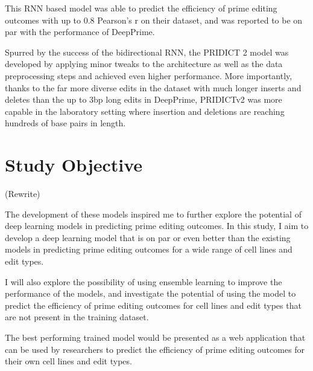 This RNN based model was able to predict the efficiency of prime editing outcomes with up to 0.8 Pearson's r on their dataset, and was reported to be on par with the performance of DeepPrime.

Spurred by the success of the bidirectional RNN, the PRIDICT 2 model was developed by applying minor tweaks to the architecture as well as the data preprocessing steps and achieved even higher performance\cite{mathisMachineLearningPrediction2024}. More importantly, thanks to the far more diverse edits in the dataset with much longer inserts and deletes than the up to 3bp long edits in DeepPrime, PRIDICTv2 was more capable in the laboratory setting where insertion and deletions are reaching hundreds of base pairs in length\cite{liuPrimeEditingPrecise2023}.

\section{Study Objective}

(Rewrite)

The development of these models inspired me to further explore the potential of deep learning models in predicting prime editing outcomes. In this study, I aim to develop a deep learning model that is on par or even better than the existing models in predicting prime editing outcomes for a wide range of cell lines and edit types. 

I will also explore the possibility of using ensemble learning to improve the performance of the models, and investigate the potential of using the model to predict the efficiency of prime editing outcomes for cell lines and edit types that are not present in the training dataset. 

The best performing trained model would be presented as a web application that can be used by researchers to predict the efficiency of prime editing outcomes for their own cell lines and edit types.